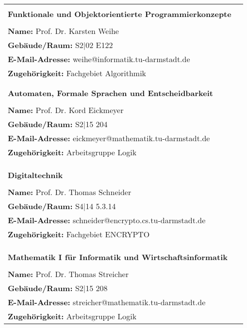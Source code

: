 \begin{tabular}{lc}

&\\
\textbf{Funktionale und Objektorientierte Programmierkonzepte}
& \multirow{4}{*}{}\\
&\\
\textbf{Name:} Prof. Dr. Karsten Weihe&\\
\textbf{Gebäude/Raum:} S2$|$02 E122 &\\
\textbf{E-Mail-Adresse:} weihe@informatik.tu-darmstadt.de &\\
\textbf{Zugehörigkeit:} Fachgebiet Algorithmik & \\

&\\&\\
\textbf{Automaten, Formale Sprachen und Entscheidbarkeit}
& \multirow{4}{*}{} \\
&\\
\textbf{Name:} Prof. Dr. Kord Eickmeyer&\\
\textbf{Gebäude/Raum:} S2$|$15 204 &\\
\textbf{E-Mail-Adresse:} eickmeyer@mathematik.tu-darmstadt.de &\\
\textbf{Zugehörigkeit:} Arbeitsgruppe Logik&\\
&\\

&\\&\\
\textbf{Digitaltechnik}
& \multirow{4}{*}{} \\
&\\
\textbf{Name:} Prof. Dr. Thomas Schneider &\\
\textbf{Gebäude/Raum:} S4$|$14 5.3.14 &\\
\textbf{E-Mail-Adresse:} schneider@encrypto.cs.tu-darmstadt.de &\\
\textbf{Zugehörigkeit:} Fachgebiet ENCRYPTO&\\
&\\

&\\&\\
\textbf{Mathematik I für Informatik und Wirtschaftsinformatik}
& \multirow{4}{*}{}\\
&\\
\textbf{Name:} Prof. Dr. Thomas Streicher &\\
\textbf{Gebäude/Raum:} S2$|$15 208 &\\
\textbf{E-Mail-Adresse:} streicher@mathematik.tu-darmstadt.de &\\
\textbf{Zugehörigkeit:} Arbeitsgruppe Logik&\\
\end{tabular}

\newpage
